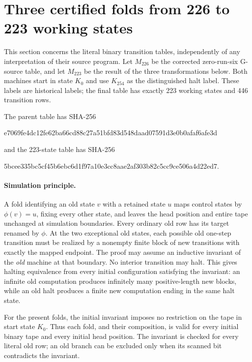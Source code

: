 \section{Three certified folds from 226 to 223 working states}
\label{sec:threefolds}

This section concerns the literal binary transition tables, independently of
any interpretation of their source program.  Let $M_{226}$ be the corrected
zero-run-six G-source table, and let $M_{223}$ be the result of the three
transformations below.  Both machines start in state $K_0$ and use $K_{254}$
as the distinguished halt label.  These labels are historical labels; the
final table has exactly 223 working states and 446 transition rows.

The parent table has SHA-256
\begin{center}\small\ttfamily
 e7069fe4dc12fe62ba66cd88c27a51bfd83d548daad07591d3e0b0afaf6afe3d
\end{center}
and the 223-state table has SHA-256
\begin{center}\small\ttfamily
 5bcee335bc5cf45b6ebc6d1f97a10e3cc8aae2af303b82c5cc9ce506a4d22ed7.
\end{center}

\paragraph{Simulation principle.}
A fold identifying an old state $v$ with a retained state $u$ maps control
states by $\phi(v)=u$, fixing every other state, and leaves the head position
and entire tape unchanged at simulation boundaries.  Every ordinary old row
has its target renamed by $\phi$.  At the two exceptional old states, each
possible old one-step transition must be realized by a nonempty finite block
of new transitions with exactly the mapped endpoint.  The proof may assume
an inductive invariant of the \emph{old} machine at that boundary.  No
interior transition may halt.  This gives halting equivalence from every
initial configuration satisfying the invariant: an infinite old computation
produces infinitely many positive-length new blocks, while an old halt
produces a finite new computation ending in the same halt state.

For the present folds, the initial invariant imposes no restriction on the
tape in start state $K_0$.  Thus each fold, and their composition, is valid
for every initial binary tape and every initial head position.  The invariant
is checked for every literal old row; an old branch can be excluded only
when its scanned bit contradicts the invariant.

